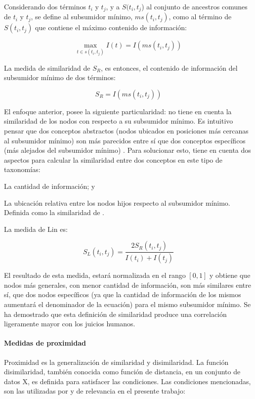 \bigskip Considerando dos términos \(t_i\) y \(t_j\), y a \(S(t_i, t_j\)) al conjunto de ancestros comunes de \(t_i\) y \(t_j\), se define al subsumidor mínimo, \(ms(t_i, t_j)\), como al término de \(S(t_i, t_j)\) que contiene el máximo contenido de información:

\[\max_{t \in s(t_i,t_j)} I(t) = I(ms(t_i,t_j))\]

\bigskip La medida de similaridad de \cite{resnik1995using} \(S_R\), es entonces, el contenido de información del subsumidor mínimo de dos términos:

\[S_R = I(ms(t_i,t_j))\]

\bigskip El enfoque anterior, posee la siguiente particularidad: no tiene en cuenta la similaridad de los nodos con respecto a su subsumidor mínimo. Es intuitivo pensar que dos conceptos abstractos (nodos ubicados en posiciones más cercanas al subsumidor mínimo) son más parecidos entre sí que dos conceptos específicos (más alejados del subsumidor mínimo) \citep{lin1998information}. Para solucionar esto, \cite{lin1998information} tiene en cuenta dos aspectos para calcular la similaridad entre dos conceptos en este tipo de taxonomías: \begin{enumerate*} [label=(\roman*)] \item La cantidad de información; y \item La ubicación relativa entre los nodos hijos respecto al subsumidor mínimo. Definida como la similaridad de \cite{resnik1995using}. \end{enumerate*}

\bigskip La medida de Lin es: 

\[S_L(t_i, t_j)=\frac{2S_R(t_i,t_j)}{I(t_i)+I(t_j)}\]

\bigskip El resultado de esta medida, estará normalizada en el rango \([0, 1]\) y obtiene que nodos más generales, con menor cantidad de información, son más similares entre sí, que dos nodos específicos (ya que la cantidad de información de los mismos aumentará el denominador de la ecuación) para el mismo subsumidor mínimo. Se ha demostrado que esta definición de similaridad produce una correlación ligeramente mayor con los juicios humanos.

\paragraph{Medidas de proximidad}
Proximidad es la generalización de similaridad y disimilaridad. La función disimilaridad, también conocida como función de distancia, en un conjunto de datos X, es definida para satisfacer las condiciones. Las condiciones mencionadas, son las utilizadas por \cite{xu2008clustering} y de relevancia en el presente trabajo:

